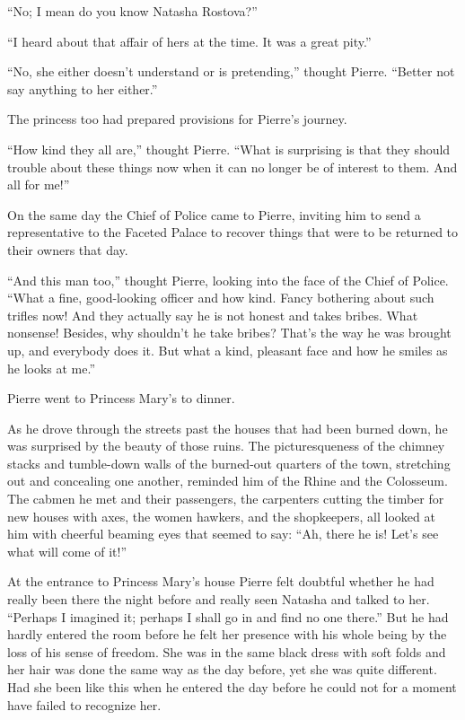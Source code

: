 ``No; I mean do you know Natasha Rostova?''

``I heard about that affair of hers at the time. It was a great
pity.''

``No, she either doesn't understand or is pretending,'' thought
Pierre.  ``Better not say anything to her either.''

The princess too had prepared provisions for Pierre's journey.

``How kind they all are,'' thought Pierre. ``What is surprising
is that they should trouble about these things now when it can no
longer be of interest to them. And all for me!''

On the same day the Chief of Police came to Pierre, inviting him
to send a representative to the Faceted Palace to recover things
that were to be returned to their owners that day.

``And this man too,'' thought Pierre, looking into the face of
the Chief of Police. ``What a fine, good-looking officer and how
kind. Fancy bothering about such trifles now! And they actually
say he is not honest and takes bribes. What nonsense! Besides,
why shouldn't he take bribes?  That's the way he was brought up,
and everybody does it. But what a kind, pleasant face and how he
smiles as he looks at me.''

Pierre went to Princess Mary's to dinner.

As he drove through the streets past the houses that had been
burned down, he was surprised by the beauty of those ruins. The
picturesqueness of the chimney stacks and tumble-down walls of
the burned-out quarters of the town, stretching out and
concealing one another, reminded him of the Rhine and the
Colosseum. The cabmen he met and their passengers, the carpenters
cutting the timber for new houses with axes, the women hawkers,
and the shopkeepers, all looked at him with cheerful beaming eyes
that seemed to say: ``Ah, there he is! Let's see what will come
of it!''

At the entrance to Princess Mary's house Pierre felt doubtful
whether he had really been there the night before and really seen
Natasha and talked to her. ``Perhaps I imagined it; perhaps I
shall go in and find no one there.'' But he had hardly entered
the room before he felt her presence with his whole being by the
loss of his sense of freedom. She was in the same black dress
with soft folds and her hair was done the same way as the day
before, yet she was quite different. Had she been like this when
he entered the day before he could not for a moment have failed
to recognize her.

